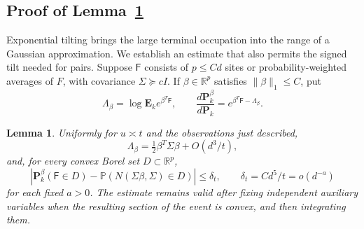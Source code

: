 \documentclass[11pt,letterpaper,reqno]{amsart}
\numberwithin{equation}{section}
\newtheorem{lemma}[theorem]{Lemma}
\theoremstyle{remark}
\begin{document}
\subsection{Proof of Lemma~\ref{lem:bounded-tilt}}\label{sec:tilt}\label{sec:tiltnormal}
Exponential tilting brings the large terminal occupation into the range of a Gaussian approximation. We establish an estimate that also permits the signed tilt needed for pairs. Suppose $\mathsf F$ consists of $p\le Cd$ sites or probability-weighted averages of $F$, with covariance $\Sigma\succeq cI$. If $\beta\in\mathbb R^p$ satisfies $\|\beta\|_1\le C$, put
\[
\Lambda_\beta=\log\mathbf E_k e^{\beta^T\mathsf F},\qquad
\frac{d\mathbf P_k^\beta}{d\mathbf P_k}
=e^{\beta^T\mathsf F-\Lambda_\beta}.
\]
\begin{lemma}\label{lem:bounded-tilt}
Uniformly for $u\asymp t$ and the observations just described,
\begin{equation}\label{eq:6.12}
\Lambda_\beta=\tfrac12\beta^T\Sigma\beta+O(d^3/t),
\end{equation}
and, for every convex Borel set $D\subset\mathbb R^p$,
\begin{equation}\label{eq:6.13}
\left|\mathbf P_k^\beta(\mathsf F\in D)
-\mathbb P(N(\Sigma\beta,\Sigma)\in D)\right|
\le\delta_t,\qquad \delta_t=Cd^5/t=o(d^{-a})
\end{equation}
for each fixed $a>0$. The estimate remains valid after fixing independent auxiliary variables when the resulting section of the event is convex, and then integrating them.
\end{lemma}
\end{document}
